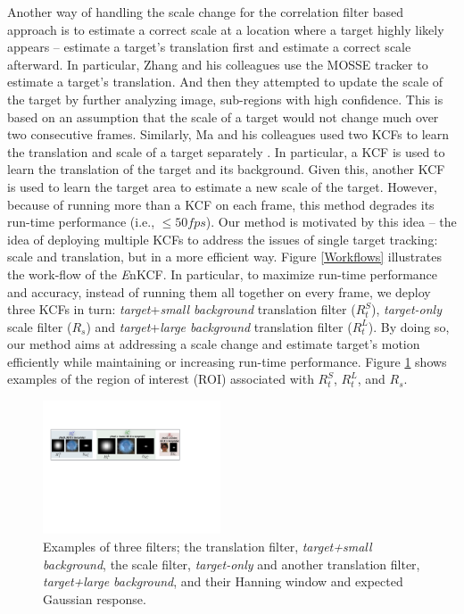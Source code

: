 \documentclass[10pt,twocolumn,letterpaper]{article}
\begin{document}
Another way of handling the scale change for the correlation filter
based approach is to estimate a correct scale at a location where a
target highly likely appears \cite{zhang2014fast} -- estimate a
target's translation first and estimate a correct scale afterward. In
particular, Zhang and his colleagues use the MOSSE tracker to estimate
a target's translation. And then they attempted to update the scale of
the target by further analyzing image, sub-regions with high
confidence. This is based on an assumption that the scale of a target
would not change much over two consecutive frames. Similarly, Ma and
his colleagues used two KCFs to learn the translation and scale of a
target separately \cite{ma2015long}. In particular, a KCF is used to
learn the translation of the target and its background. Given this,
another KCF is used to learn the target area to estimate a new scale
of the target. However, because of running more than a KCF on each
frame, this method degrades its run-time performance (i.e., $\leq 50
fps$). Our method is motivated by this idea -- the idea of deploying
multiple KCFs to address the issues of single target tracking: scale
and translation, but in a more efficient way. Figure \ref{Workflows}
illustrates the work-flow of the {\it E}nKCF. In particular, to
maximize run-time performance and accuracy, instead of running them
all together on every frame, we deploy three KCFs in turn:
\textit{target}+\textit{small background} translation filter
($R_{t}^{S}$), \textit{target-only} scale filter ($R_{s}$) and
\textit{target}+\textit{large background} translation filter
($R_{t}^{L}$). By doing so, our method aims at addressing a scale
change and estimate target's motion efficiently while maintaining or
increasing run-time performance. Figure \ref{fig:Filters} shows
examples of the region of interest (ROI) associated with $R_{t}^{S}$,
$R_{t}^{L}$, and $R_{s}$.

\begin{figure}[!h]
\centering
\includegraphics[width=0.47\textwidth]{./figures/Filters_Details.pdf}
\caption{Examples of three filters; the translation filter,
  \textit{target+small background}, the scale filter,
  \textit{target-only} and another translation filter,
  \textit{target+large background}, and their Hanning window and
  expected Gaussian response.}
\label{fig:Filters}
\end{figure}
\end{document}
